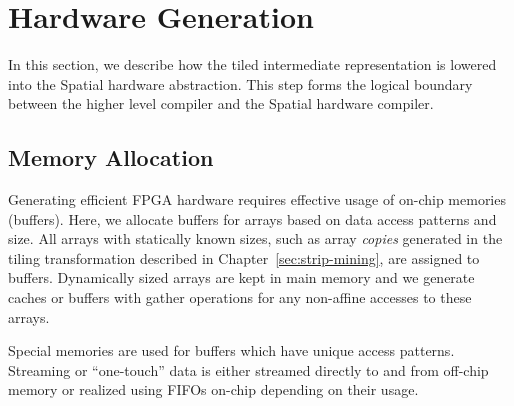 \section{Hardware Generation}
\label{hardware}

In this section, we describe how the tiled intermediate representation is
lowered into the Spatial hardware abstraction. This step forms the logical boundary
between the higher level compiler and the Spatial hardware compiler.

\subsection{Memory Allocation}
Generating efficient FPGA hardware requires effective usage of on-chip memories (buffers).
Here, we allocate buffers for arrays based on data access patterns and size.
All arrays with statically known sizes, such as array \emph{copies} generated in the tiling transformation described in
Chapter~\ref{sec:strip-mining}, are assigned to buffers.
Dynamically sized arrays are kept in main memory and we generate
caches or buffers with gather operations for any non-affine accesses to these arrays.

Special memories are used for buffers which have unique access patterns.
Streaming or ``one-touch'' data is  either streamed directly to and from off-chip memory
or realized using FIFOs on-chip depending on their usage.

